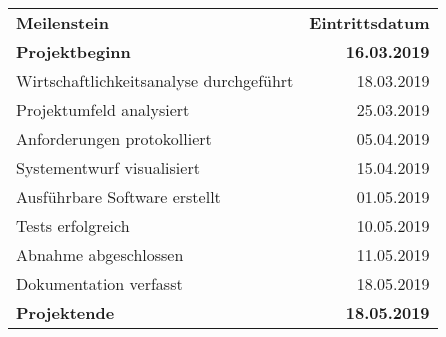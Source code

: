 \begin{tabular}{lr}
\rowcolor{KVGruen}\textbf{Meilenstein} & \textbf{Eintrittsdatum} \\
\textbf{Projektbeginn} & \textbf{16.03.2019} \\
\rowcolor{KVGrau}Wirtschaftlichkeitsanalyse durchgeführt & 18.03.2019 \\
Projektumfeld analysiert & 25.03.2019 \\
\rowcolor{KVGrau}Anforderungen protokolliert & 05.04.2019 \\
Systementwurf visualisiert & 15.04.2019 \\
\rowcolor{KVGrau}Ausführbare Software erstellt & 01.05.2019 \\
Tests erfolgreich & 10.05.2019 \\
\rowcolor{KVGrau}Abnahme abgeschlossen & 11.05.2019 \\
Dokumentation verfasst & 18.05.2019 \\
\rowcolor{KVGrau}\textbf{Projektende} & \textbf{18.05.2019} \\
\end{tabular}
